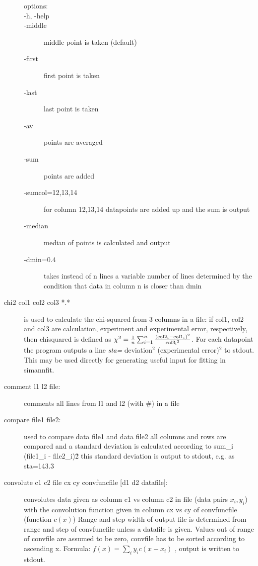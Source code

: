 \begin{description}
\begin{description}
 \item [options:]
  \item[-h, -help]
  \item       [-middle]       middle point is taken (default)
  \item       [-first]       first point is taken 
   \item      [-last]        last point is taken 
   \item      [-av]           points are averaged
   \item      [-sum]           points are added
    \item     [-sumcol=12,13,14]  for column 12,13,14 datapoints are added up and the sum is output
    \item     [-median]       median of points is calculated and output
     \item    [-dmin=0.4]    takes instead of n lines a variable number
                         of lines determined by the condition that
                         data in column n is closer than dmin 
\end{description}       

\item [\prg chi2\index{chi2} col1 col2 col3 *.*] is used to calculate the 
 chi-squared from 3 columns in a file: if col1, col2 and col3 are calculation, 
 experiment and experimental error, respectively, then
  chisquared is defined as $\chi^2=\frac{1}{n}\sum_{i=1}^n \frac{({\rm col2}_i-{\rm %
col1}_i)^2}{{\rm col3_i}^2}$. For each datapoint the program outputs a line
{\em sta=} deviation$^2$  (experimental error)$^2$ to stdout. This may be 
used directly for generating useful input for fitting in {\prg simannfit}.
\item [\prg comment l1 l2 file:] comments all lines from l1 and l2  (with \#) in a file
\item [\prg compare file1 file2:] used to compare data file1 and data file2
                all columns and rows are compared and a standard deviation
                is calculated according to sum\_i (file1\_i - file2\_i)\^2
                this standard deviation is output to stdout, e.g. as sta=143.3
\item [\prg convolute\index{convolute} c1 c2 file cx cy convfuncfile {[d1 d2 datafile]}:] %
convolutes data given as column c1 vs column
                       c2 in file (data pairs $x_i,y_i$) with the convolution function given in %
column cx vs cy
		        of convfuncfile (function $c(x)$)
		       Range and step width of output file is determined from range and step 
		        of convfuncfile  unless a datafile is given.  Values out of range of convfile are assumed to be zero,
			convfile has to be sorted according to ascending x.
			Formula: $f(x)=\sum_i y_i c(x-x_i)$ , 
		       output is written to stdout. 


\end{description}
